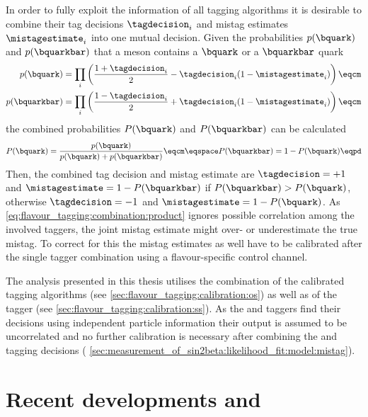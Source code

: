 In order to fully exploit the information of all tagging algorithms it is
desirable to combine their tag decisions $\tagdecision_i$ and mistag estimates
$\mistagestimate_i$ into one mutual decision. Given the probabilities
$p(\bquark)$ and $p(\bquarkbar)$ that a meson contains a $\bquark$ or a
$\bquarkbar$ quark
%
\begin{equation}\label{eq:flavour_tagging:combination:product}
  \begin{split}
    p(\bquark)    &= \prod_i\left( \frac{1 + \tagdecision_i}{2} - \tagdecision_i (1 - \mistagestimate_i) \right)\eqcm\\
    p(\bquarkbar) &= \prod_i\left( \frac{1 - \tagdecision_i}{2} + \tagdecision_i (1 - \mistagestimate_i) \right)\eqcm
  \end{split}
\end{equation}
%
the combined probabilities $P(\bquark)$ and $P(\bquarkbar)$ can be calculated
%
\begin{equation}\label{eq:flavour_tagging:combination:total}
  P(\bquark)    = \frac{p(\bquark)}{p(\bquark) + p(\bquarkbar)}\eqcm\eqspace
  P(\bquarkbar) = 1 - P(\bquark)\eqpd
\end{equation}
%
Then, the combined tag decision and mistag estimate are $\tagdecision = +1$ and
$\mistagestimate = 1 - P(\bquarkbar)$ if $P(\bquarkbar) > P(\bquark)$, otherwise
$\tagdecision = -1$ and $\mistagestimate = 1 - P(\bquark)$. As
\cref{eq:flavour_tagging:combination:product} ignores possible correlation among
the involved taggers, the joint mistag estimate might over- or underestimate the
true mistag. To correct for this the mistag estimates as well have to be
calibrated after the single tagger combination using a flavour-specific control
channel.

The analysis presented in this thesis utilises the combination of the calibrated
\OS tagging algorithms (see \cref{sec:flavour_tagging:calibration:os}) as well
as of the \SSpi tagger (see \cref{sec:flavour_tagging:calibration:ss}). As the
\OS and \SS taggers find their decisions using independent particle information
their output is assumed to be uncorrelated and no further calibration is
necessary after combining the \OS and \SSpi tagging decisions (\cf
\cref{sec:measurement_of_sin2beta:likelihood_fit:model:mistag}).

\section{Recent developments and \RunTwo}
\label{sec:flavour_tagging:developments}

